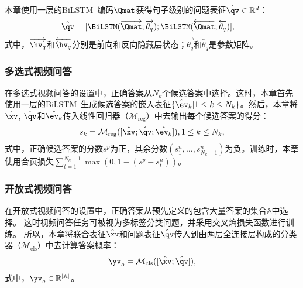 本章使用一层的BiLSTM~\cite{hochreiter1997long}编码$\Qmat$获得句子级别的问题表征$\hat{\qv} \in \mathbb{R}^d$：
\begin{equation}
\begin{aligned}
\hat{\qv} &= [\BiLSTM(\overrightarrow{\Qmat}; \overrightarrow{\theta_q}); \BiLSTM(\overleftarrow{\Qmat}; \overleftarrow{\theta_q})], 
\label{eq:q_bilstm}
\end{aligned}
\end{equation}
式中，$\overrightarrow{\hv_q}$和$\overleftarrow{\hv_q}$分别是前向和反向隐藏层状态；$\overrightarrow{\theta_q}$和$\overleftarrow{\theta_q}$是参数矩阵。



\subsubsection{多选式视频问答}
在多选式视频问答的设置中，正确答案从$N_k$个候选答案中选择。这时，本章首先使用一层的BiLSTM~\cite{hochreiter1997long}生成候选答案的嵌入表征$\{\hat{\ev}_k|1 \leq k \leq N_k\}$。然后，本章将$\hat{\xv}$, $\hat{\qv}$和$\hat{\ev_k}$传入线性回归器（$\mathcal{M}_{\text{reg}}$）中去输出每个候选答案的得分：
\begin{equation}
\begin{aligned}
s_k = \mathcal{M}_{\text{reg}}([\hat{\xv}; \hat{\qv}; \hat{\ev_{k}}]), 1 \leq k \leq N_k,  
\end{aligned}
\end{equation} 
式中，正确候选答案的分数$s^p$为正，其余分数$(s_1^n, \dots, s_{N_k -1}^n)$为负。训练时，本章使用合页损失$\sum_{t=1}^{N_k-1}\max (0, 1 - (s^p - s_{t}^n))$。

\subsubsection{开放式视频问答}
在开放式视频问答的设置中，正确答案从预先定义的包含大量答案的集合$\mathbb{A}$中选择。
这时视频问答任务可被视为多标签分类问题，并采用交叉熵损失函数进行训练。
所以，本章将联合表征$\hat{\xv}$和问题表征$\hat{\qv}$传入到由两层全连接层构成的分类器（$\mathcal{M}_{\text{cls}}$）中去计算答案概率：
\begin{equation}
\begin{aligned}
\yv_o = \mathcal{M}_{\text{cls}}([\hat{\xv}; \hat{\qv}]), 
\end{aligned}
\end{equation}
式中，$\yv_o \in \mathbb{R}^{|\mathbb{A}|}$。


